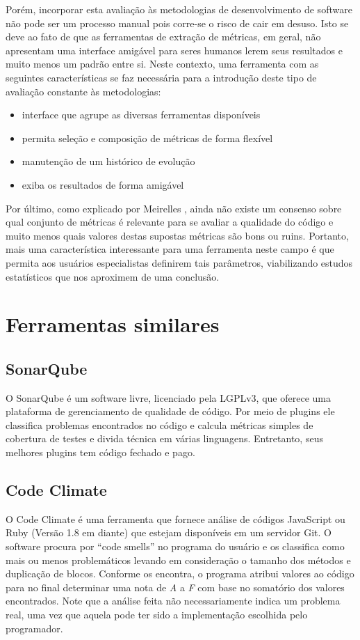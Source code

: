 \documentclass[12pt]{article}
\begin{document}
Porém, incorporar esta avaliação às metodologias de desenvolvimento de software não pode ser um processo manual pois corre-se o risco de cair em desuso. Isto se deve ao fato de que as ferramentas de extração de métricas, em geral, não apresentam uma interface amigável para seres humanos lerem seus resultados e muito menos um padrão entre si.
Neste contexto, uma ferramenta com as seguintes características se faz necessária para a introdução deste tipo de avaliação constante às metodologias:
\begin{itemize}
  \item interface que agrupe as diversas ferramentas disponíveis
  \item permita seleção e composição de métricas de forma flexível
  \item manutenção de um histórico de evolução
  \item exiba os resultados de forma amigável
\end{itemize}
Por último, como explicado por Meirelles \cite{m13}, ainda não existe um consenso sobre qual conjunto de métricas é relevante para se avaliar a qualidade do código e muito menos quais valores destas supostas métricas são bons ou ruins. Portanto, mais uma característica interessante para uma ferramenta neste campo é que permita aos usuários especialistas definirem tais parâmetros, viabilizando estudos estatísticos que nos aproximem de uma conclusão.
\section{Ferramentas similares}
  \subsection{SonarQube}
  O SonarQube é um software livre, licenciado pela LGPLv3, que oferece uma plataforma de gerenciamento de qualidade de código. Por meio de plugins ele classifica problemas encontrados no código e calcula métricas simples de cobertura de testes e divida técnica em várias linguagens. Entretanto, seus melhores plugins tem código fechado e pago.
  \subsection{Code Climate}
  O Code Climate é uma ferramenta que fornece análise de códigos JavaScript ou Ruby (Versão 1.8 em diante) que estejam disponíveis em um servidor Git.
  O software procura por ``code smells'' no programa do usuário e os classifica como mais ou menos problemáticos levando em consideração o tamanho dos métodos e duplicação de blocos. Conforme os encontra, o programa atribui valores ao código para no final determinar uma nota de \textit{A} a \textit{F} com base no somatório dos valores encontrados. Note que a análise feita não necessariamente indica um problema real, uma vez que aquela pode ter sido a implementação escolhida pelo programador.
\end{document}
